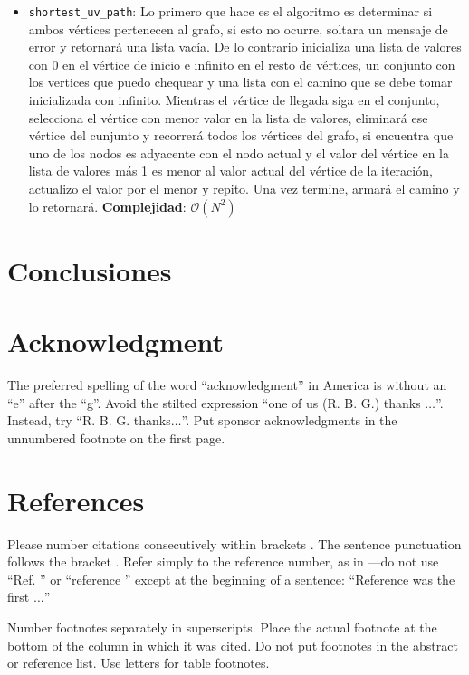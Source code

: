 \documentclass[conference]{IEEEtran}
\begin{document}
\begin{itemize}
\item \texttt{shortest\_uv\_path}: Lo primero que hace es el algoritmo es determinar si ambos vértices pertenecen al grafo, si esto no ocurre, soltara un mensaje de error y retornará una lista vacía. De lo contrario inicializa una lista de valores con 0 en el vértice de inicio e infinito en el resto de vértices, un conjunto con los vertices que puedo chequear y una lista con el camino que se debe tomar inicializada con infinito. Mientras el vértice de llegada siga en el conjunto, selecciona el vértice con menor valor en la lista de valores, eliminará ese vértice del cunjunto y recorrerá todos los vértices del grafo, si encuentra que uno de los nodos es adyacente con el nodo actual y el valor del vértice en la lista de valores más 1 es menor al valor actual del vértice de la iteración, actualizo el valor por el menor y repito. Una vez termine, armará el camino y lo retornará. \textbf{Complejidad}: $\mathcal{O}(N^2)$
\end{itemize}
\section{Conclusiones}

\section*{Acknowledgment}

The preferred spelling of the word ``acknowledgment'' in America is without 
an ``e'' after the ``g''. Avoid the stilted expression ``one of us (R. B. 
G.) thanks $\ldots$''. Instead, try ``R. B. G. thanks$\ldots$''. Put sponsor 
acknowledgments in the unnumbered footnote on the first page.

\section*{References}

Please number citations consecutively within brackets \cite{b1}. The 
sentence punctuation follows the bracket \cite{b2}. Refer simply to the reference 
number, as in \cite{b3}---do not use ``Ref. \cite{b3}'' or ``reference \cite{b3}'' except at 
the beginning of a sentence: ``Reference \cite{b3} was the first $\ldots$''

Number footnotes separately in superscripts. Place the actual footnote at 
the bottom of the column in which it was cited. Do not put footnotes in the 
abstract or reference list. Use letters for table footnotes.
\end{document}
